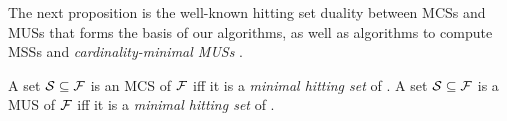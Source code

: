 The next proposition is the well-known hitting set duality \cite{DBLP:journals/jar/LiffitonS08,ai/Reiter87}  between MCSs and MUSs that forms the basis of our algorithms, as well as algorithms to compute MSSs \citet{DBLP:conf/sat/DaviesB13} and \emph{cardinality-minimal MUSs} \cite{ignatiev2015smallest}.

\begin{proposition}\label{prop:MCS-MUS-hittingset}
%     
    A set  $\mathcal{S} \subseteq \mathcal{F} $ is an MCS of $ \mathcal{F} $ iff  it is a \emph{minimal hitting set} of .
% 
    A set  $\mathcal{S} \subseteq \mathcal{F} $ is a MUS of $ \mathcal{F} $ iff  it is a \emph{minimal hitting set} of .
\end{proposition}
 


% 
% 
% 
% 
% 
